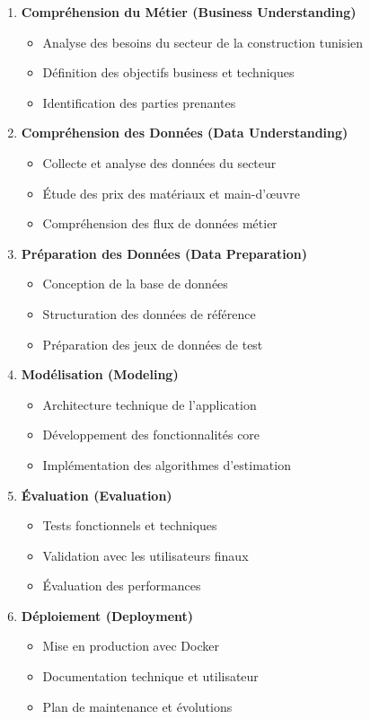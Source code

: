 \begin{enumerate}
    \item \textbf{Compréhension du Métier (Business Understanding)}
    \begin{itemize}
        \item Analyse des besoins du secteur de la construction tunisien
        \item Définition des objectifs business et techniques
        \item Identification des parties prenantes
    \end{itemize}
    
    \item \textbf{Compréhension des Données (Data Understanding)}
    \begin{itemize}
        \item Collecte et analyse des données du secteur
        \item Étude des prix des matériaux et main-d'œuvre
        \item Compréhension des flux de données métier
    \end{itemize}
    
    \item \textbf{Préparation des Données (Data Preparation)}
    \begin{itemize}
        \item Conception de la base de données
        \item Structuration des données de référence
        \item Préparation des jeux de données de test
    \end{itemize}
    
    \item \textbf{Modélisation (Modeling)}
    \begin{itemize}
        \item Architecture technique de l'application
        \item Développement des fonctionnalités core
        \item Implémentation des algorithmes d'estimation
    \end{itemize}
    
    \item \textbf{Évaluation (Evaluation)}
    \begin{itemize}
        \item Tests fonctionnels et techniques
        \item Validation avec les utilisateurs finaux
        \item Évaluation des performances
    \end{itemize}
    
    \item \textbf{Déploiement (Deployment)}
    \begin{itemize}
        \item Mise en production avec Docker
        \item Documentation technique et utilisateur
        \item Plan de maintenance et évolutions
    \end{itemize}
\end{enumerate}

